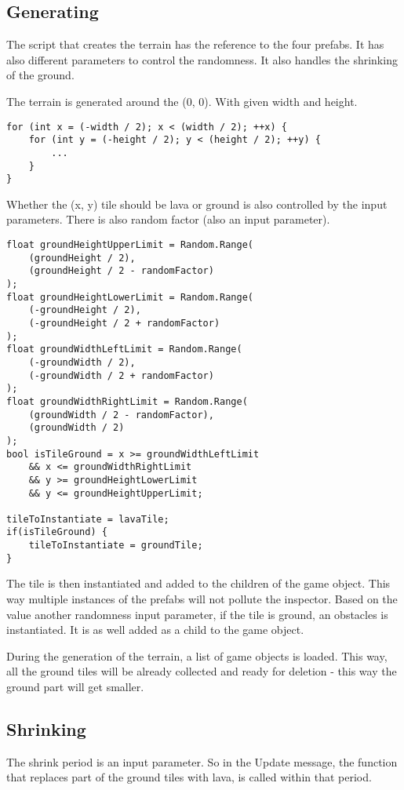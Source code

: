 \documentclass[11pt]{article}
\begin{document}
\subsection{Generating}
\label{sec:orgd4f5b1c}
The script that creates the terrain has the reference to the four prefabs. It has also different parameters to control the randomness. It also handles the shrinking of the ground.

The terrain is generated around the (0, 0). With given width and height.
\begin{verbatim}
for (int x = (-width / 2); x < (width / 2); ++x) {
    for (int y = (-height / 2); y < (height / 2); ++y) {
        ...
    }
}
\end{verbatim}

Whether the (x, y) tile should be lava or ground is also controlled by the input parameters. There is also random factor (also an input parameter).
\begin{verbatim}
float groundHeightUpperLimit = Random.Range(
    (groundHeight / 2),
    (groundHeight / 2 - randomFactor)
);
float groundHeightLowerLimit = Random.Range(
    (-groundHeight / 2),
    (-groundHeight / 2 + randomFactor)
);
float groundWidthLeftLimit = Random.Range(
    (-groundWidth / 2),
    (-groundWidth / 2 + randomFactor)
);
float groundWidthRightLimit = Random.Range(
    (groundWidth / 2 - randomFactor),
    (groundWidth / 2)
);
bool isTileGround = x >= groundWidthLeftLimit
    && x <= groundWidthRightLimit
    && y >= groundHeightLowerLimit
    && y <= groundHeightUpperLimit;

tileToInstantiate = lavaTile;
if(isTileGround) {
    tileToInstantiate = groundTile;
}
\end{verbatim}

The tile is then instantiated and added to the children of the game object. This way multiple instances of the prefabs will not pollute the inspector.
Based on the value another randomness input parameter, if the tile is ground, an obstacles is instantiated. It is as well added as a child to the game object.

During the generation of the terrain, a list of game objects is loaded. This way, all the ground tiles will be already collected and ready for deletion - this way the ground part will get smaller.

\subsection{Shrinking}
\label{sec:org616f999}
The shrink period is an input parameter. So in the Update message, the function that replaces part of the ground tiles with lava, is called within that period.
\end{document}
